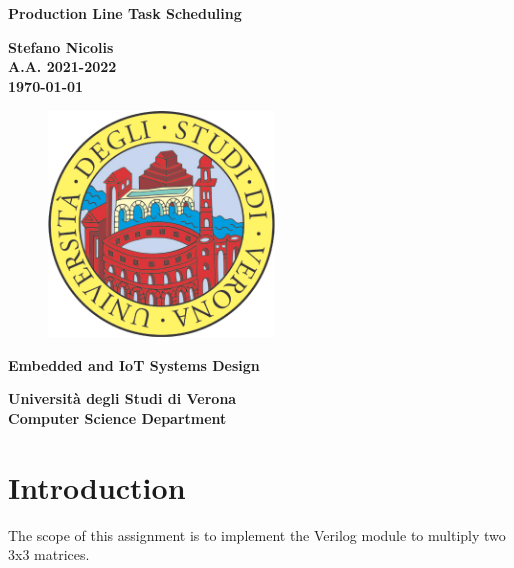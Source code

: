 \documentclass[12pt]{article}
\title{}
\author{Stefano Nicolis}
\begin{document}
\begin{titlepage}
   \begin{center}
       \vspace*{1cm}
 
	\large
      {\huge \textbf{Production Line Task Scheduling} }
 
       \vspace{1.5cm}
 
       \textbf{Stefano Nicolis}\\
	\textbf{A.A. 2021-2022}\\
	\vspace{0.35cm}
	\textbf{\today}

\vfill
\begin{figure}[h!]
	\begin{center}
	  \includegraphics[height=6cm, width=6cm]{media/logounivr}
	\end{center}
\end{figure}
 
	\vfill
 	\textbf{Embedded and IoT Systems Design\\}
 
       \vspace{3cm}
 
      \begin{multicols}{2}
      \textbf{Università degli Studi di Verona\\
	 Computer Science Department}
	\end{multicols}
 
   \end{center}
\end{titlepage}


\tableofcontents

\section{Introduction}
The scope of this assignment is to implement the Verilog module to multiply two 3x3 matrices.
\end{document}
